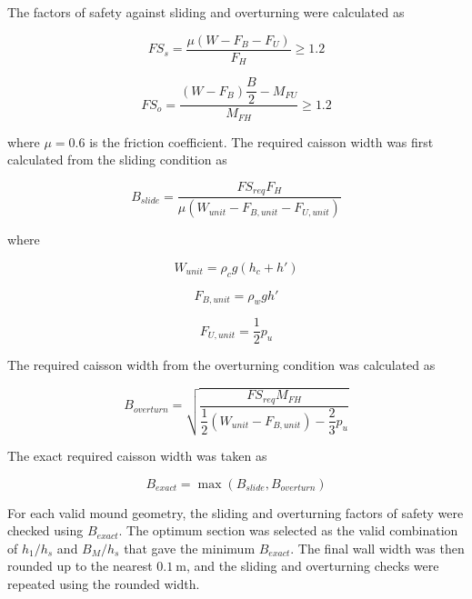 \documentclass[a4paper, 11pt]{article}
\begin{document}
The factors of safety against sliding and overturning were calculated as

\begin{equation}
    FS_s=
    \frac{\mu(W-F_B-F_U)}{F_H}
    \geq1.2
\end{equation}

\begin{equation}
    FS_o=
    \frac{(W-F_B)\dfrac{B}{2}-M_{FU}}{M_{FH}}
    \geq1.2
\end{equation}

where \(\mu=0.6\) is the friction coefficient. The required caisson width was first calculated from the sliding condition as

\begin{equation}
    B_{slide}
    =
    \frac{FS_{req}F_H}
    {\mu(W_{unit}-F_{B,unit}-F_{U,unit})}
\end{equation}

where

\begin{equation}
    W_{unit}=\rho_cg(h_c+h')
\end{equation}

\begin{equation}
    F_{B,unit}=\rho_wgh'
\end{equation}

\begin{equation}
    F_{U,unit}=\frac{1}{2}p_u
\end{equation}

The required caisson width from the overturning condition was calculated as

\begin{equation}
    B_{overturn}
    =
    \sqrt{
    \frac{FS_{req}M_{FH}}
    {
    \dfrac{1}{2}(W_{unit}-F_{B,unit})
    -
    \dfrac{2}{3}p_u
    }}
\end{equation}

The exact required caisson width was taken as

\begin{equation}
    B_{exact}=\max(B_{slide},B_{overturn})
\end{equation}

For each valid mound geometry, the sliding and overturning factors of safety were checked using \(B_{exact}\). The optimum section was selected as the valid combination of \(h_1/h_s\) and \(B_M/h_s\) that gave the minimum \(B_{exact}\). The final wall width was then rounded up to the nearest \(0.1~\mathrm{m}\), and the sliding and overturning checks were repeated using the rounded width.
\end{document}
